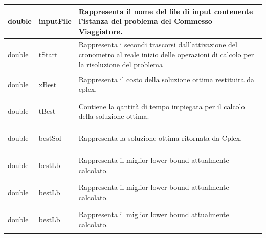 \documentclass[11pt]{article}
\begin{document}
\begin{center}
\begin{longtable}{ | p{4cm} | p{4cm} | p{7cm} |}
    \begin{center} double \end{center} & \begin{center} inputFile \end{center}&\vfill Rappresenta il nome del file di input contenente l'istanza del problema del Commesso Viaggiatore. \vfill\\ \hline
    \begin{center} double \end{center} & \begin{center} tStart \end{center}& \vfill Rappresenta i secondi trascorsi dall'attivazione del cronometro al reale inizio delle operazioni di calcolo per la risoluzione del problema \vfill \\ \hline
    \begin{center} double \end{center} & \begin{center} xBest \end{center}& \vfill Rappresenta il costo della soluzione ottima restituira da cplex.\vfill \\ \hline
    \begin{center} double \end{center} & \begin{center} tBest \end{center}& \vfill Contiene la qantità di tempo impiegata per il calcolo della soluzione ottima. \vfill \\ \hline
    \begin{center} double \end{center} & \begin{center} bestSol \end{center}& \vfill Rappresenta la soluzione ottima ritornata da Cplex.\vfill \\ \hline
     \begin{center} double \end{center} & \begin{center} bestLb \end{center}& \vfill Rappresenta il miglior lower bound attualmente calcolato.\vfill \\ \hline
    \begin{center} double \end{center} & \begin{center} bestLb \end{center}& \vfill Rappresenta il miglior lower bound attualmente calcolato.\vfill \\ \hline
     \begin{center} double \end{center} & \begin{center} bestLb \end{center}& \vfill Rappresenta il miglior lower bound attualmente calcolato.\vfill \\ \hline
    \end{longtable}
\end{center}
\end{document}

